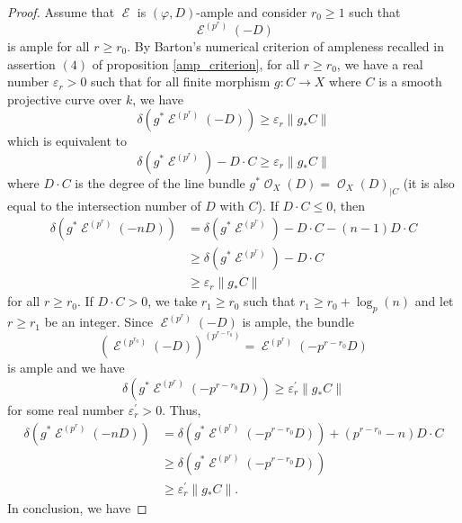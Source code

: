 \documentclass[10pt,a4paper]{amsart}
\DeclareMathOperator{\E}{\mathcal{E}}
\DeclareMathOperator{\Oc}{\mathcal{O}}
\begin{document}
\begin{proof}
Assume that $\E$ is $(\varphi,D)$-ample and consider $r_0 \geq 1$ such that $$\E^{(p^r)}(-D)$$ is ample for all $r \geq r_0$. By Barton's numerical criterion of ampleness recalled in assertion $(4)$ of proposition \ref{amp_criterion}, for all $r \geq r_0$, we have a real number $\varepsilon_r > 0$ such that for all finite morphism $g : C \rightarrow X$ where $C$ is a smooth projective curve over $k$, we have
\begin{equation*}
\delta(g^*\E^{(p^r)}(-D)) \geq \varepsilon_r\lVert g_*C \rVert
\end{equation*} 
which is equivalent to
\begin{equation*}
\delta(g^*\E^{(p^r)}) -D\cdot C \geq \varepsilon_r\lVert g_*C \rVert
\end{equation*}
where $D\cdot C$ is the degree of the line bundle $g^*\Oc_X(D) = \Oc_X(D)_{|C}$ (it is also equal to the intersection number of $D$ with $C$). If $D\cdot C\leq 0$, then 
\begin{equation*}
\begin{aligned}
\delta(g^*\E^{(p^r)}(-nD)) &= \delta(g^*\E^{(p^r)})-D\cdot C - (n-1)D\cdot C \\
&\geq \delta(g^*\E^{(p^r)})-D\cdot C \\
&\geq \varepsilon_r\lVert g_*C \rVert
\end{aligned}
\end{equation*}
for all $r\geq r_0$. If $D\cdot C > 0$, we take $r_1 \geq r_0$ such that $r_1 \geq r_0 + \log_p(n)$ and let $r\geq r_1$ be an integer. Since $\E^{(p^r)}(-D)$ is ample, the bundle 
\begin{equation*}
(\E^{(p^{r_0})}(-D))^{(p^{r-r_0})} = \E^{(p^r)}(-p^{r-r_0}D)
\end{equation*}
is ample and we have
\begin{equation*}
\delta(g^*\E^{(p^r)}(-p^{r-r_0}D)) \geq \varepsilon_r^\prime \lVert g_*C \rVert
\end{equation*}
for some real number $\varepsilon_r^\prime > 0$. Thus,
\begin{equation*}
\begin{aligned}
\delta(g^*\E^{(p^r)}(-nD)) &= \delta(g^*\E^{(p^r)}(-p^{r-r_0}D)) +(p^{r-r_0}-n)D\cdot C \\
&\geq  \delta(g^*\E^{(p^r)}(-p^{r-r_0}D)) \\
&\geq \varepsilon_r^\prime \lVert g_*C \rVert.
\end{aligned}
\end{equation*}
In conclusion, we have

\end{proof}
\end{document}
